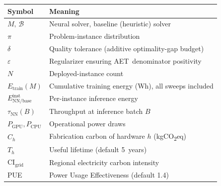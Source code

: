 \documentclass[11pt]{article}
\newcommand{\AET}{AET}
\begin{document}
\begin{tabular}{ll}
\toprule
Symbol & Meaning \\
\midrule
\(M,\,\mathcal{B}\)        & Neural solver, baseline (heuristic) solver \\
\(\pi\)                    & Problem-instance distribution \\
\(\delta\)                 & Quality tolerance (additive optimality-gap budget) \\
\(\varepsilon\)            & Regularizer ensuring \AET\ denominator positivity \\
\(N\)                      & Deployed-instance count \\
\(E_\text{train}(M)\)      & Cumulative training energy (Wh), all sweeps included \\
\(E^\text{inst}_{\text{NN/base}}\) & Per-instance inference energy \\
\(\tau_\text{NN}(B)\)      & Throughput at inference batch \(B\) \\
\(P_\text{GPU},P_\text{CPU}\) & Operational power draws \\
\(C_h\)                    & Fabrication carbon of hardware \(h\) (kgCO\textsubscript{2}eq) \\
\(T_h\)                    & Useful lifetime (default 5~years) \\
\(\mathrm{CI}_\text{grid}\) & Regional electricity carbon intensity \\
PUE                        & Power Usage Effectiveness (default 1.4) \\
\bottomrule
\end{tabular}
\end{document}
